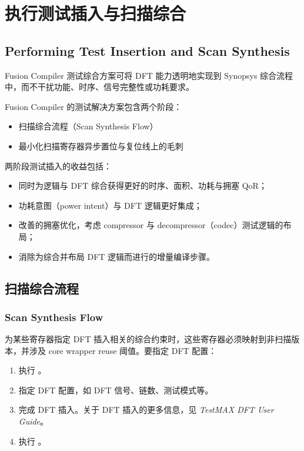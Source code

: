 \section{执行测试插入与扫描综合}
\subsection*{Performing Test Insertion and Scan Synthesis}

Fusion Compiler 测试综合方案可将 DFT 能力透明地实现到 Synopsys 综合流程中，而不干扰功能、时序、信号完整性或功耗要求。

Fusion Compiler 的测试解决方案包含两个阶段：
\begin{itemize}
  \item 扫描综合流程（Scan Synthesis Flow）
  \item 最小化扫描寄存器异步置位与复位线上的毛刺
\end{itemize}

两阶段测试插入的收益包括：
\begin{itemize}
  \item 同时为逻辑与 DFT 综合获得更好的时序、面积、功耗与拥塞 QoR；
  \item 功耗意图（power intent）与 DFT 逻辑更好集成；
  \item 改善的拥塞优化，考虑 compressor 与 decompressor（codec）测试逻辑的布局；
  \item 消除为综合并布局 DFT 逻辑而进行的增量编译步骤。
\end{itemize}

\subsection{扫描综合流程}
\subsubsection*{Scan Synthesis Flow}

为某些寄存器指定 DFT 插入相关的综合约束时，这些寄存器必须映射到非扫描版本，并涉及 core wrapper reuse 阈值。要指定 DFT 配置：
\begin{enumerate}
  \item 执行 。
  \item 指定 DFT 配置，如 DFT 信号、链数、测试模式等。
  \item 完成 DFT 插入。关于 DFT 插入的更多信息，见 \textit{TestMAX DFT User Guide}。
  \item 执行 。
\end{enumerate}

